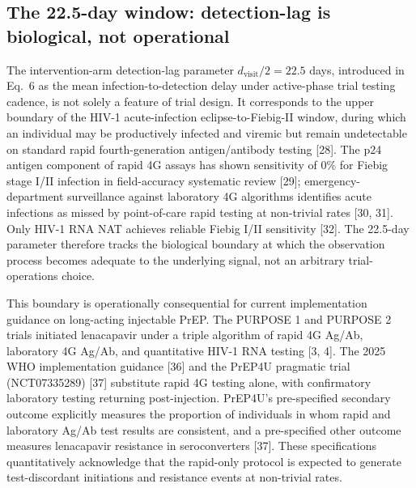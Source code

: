 \documentclass[12pt]{article}
\begin{document}
\subsection{The 22.5-day window: detection-lag is biological, not operational}

The intervention-arm detection-lag parameter $d_{\mathrm{visit}}/2 = 22.5$ days, introduced in Eq.\ 6 as the mean infection-to-detection delay under active-phase trial testing cadence, is not solely a feature of trial design. It corresponds to the upper boundary of the HIV-1 acute-infection eclipse-to-Fiebig-II window, during which an individual may be productively infected and viremic but remain undetectable on standard rapid fourth-generation antigen/antibody testing [28]. The p24 antigen component of rapid 4G assays has shown sensitivity of 0\% for Fiebig stage I/II infection in field-accuracy systematic review [29]; emergency-department surveillance against laboratory 4G algorithms identifies acute infections as missed by point-of-care rapid testing at non-trivial rates [30, 31]. Only HIV-1 RNA NAT achieves reliable Fiebig I/II sensitivity [32]. The 22.5-day parameter therefore tracks the biological boundary at which the observation process becomes adequate to the underlying signal, not an arbitrary trial-operations choice.

This boundary is operationally consequential for current implementation guidance on long-acting injectable PrEP. The PURPOSE 1 and PURPOSE 2 trials initiated lenacapavir under a triple algorithm of rapid 4G Ag/Ab, laboratory 4G Ag/Ab, and quantitative HIV-1 RNA testing [3, 4]. The 2025 WHO implementation guidance [36] and the PrEP4U pragmatic trial (NCT07335289) [37] substitute rapid 4G testing alone, with confirmatory laboratory testing returning post-injection. PrEP4U's pre-specified secondary outcome explicitly measures the proportion of individuals in whom rapid and laboratory Ag/Ab test results are consistent, and a pre-specified other outcome measures lenacapavir resistance in seroconverters [37]. These specifications quantitatively acknowledge that the rapid-only protocol is expected to generate test-discordant initiations and resistance events at non-trivial rates.
\end{document}
